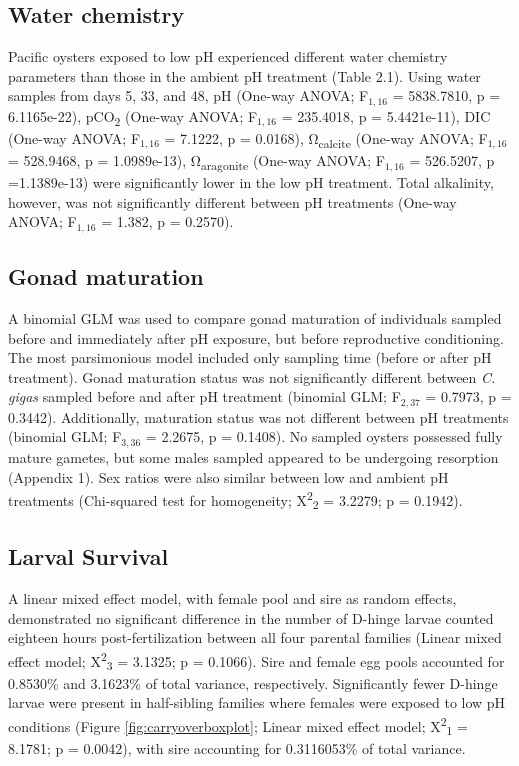 \documentclass [11pt, proquest] {uwthesis}[2015/03/03]
\begin{document}
\hypertarget{water-chemistry}{%
\subsection{Water chemistry}\label{water-chemistry}}

Pacific oysters exposed to low pH experienced different water chemistry parameters than those in the ambient pH treatment (Table 2.1). Using water samples from days 5, 33, and 48, pH (One-way ANOVA; F\(_{1,16}\) = 5838.7810, p = 6.1165e-22), pCO\textsubscript{2} (One-way ANOVA; F\(_{1,16}\) = 235.4018, p = 5.4421e-11), DIC (One-way ANOVA; F\(_{1,16}\) = 7.1222, p = 0.0168), Ω\textsubscript{calcite} (One-way ANOVA; F\(_{1,16}\) = 528.9468, p = 1.0989e-13), Ω\textsubscript{aragonite} (One-way ANOVA; F\(_{1,16}\) = 526.5207, p =1.1389e-13) were significantly lower in the low pH treatment. Total alkalinity, however, was not significantly different between pH treatments (One-way ANOVA; F\(_{1,16}\) = 1.382, p = 0.2570).

\hypertarget{gonad-maturation}{%
\subsection{Gonad maturation}\label{gonad-maturation}}

A binomial GLM was used to compare gonad maturation of individuals sampled before and immediately after pH exposure, but before reproductive conditioning. The most parsimonious model included only sampling time (before or after pH treatment). Gonad maturation status was not significantly different between \emph{C. gigas} sampled before and after pH treatment (binomial GLM; F\(_{2,37}\) = 0.7973, p = 0.3442). Additionally, maturation status was not different between pH treatments (binomial GLM; F\(_{3,36}\) = 2.2675, p = 0.1408). No sampled oysters possessed fully mature gametes, but some males sampled appeared to be undergoing resorption (Appendix 1). Sex ratios were also similar between low and ambient pH treatments (Chi-squared test for homogeneity; X\textsuperscript{2}\textsubscript{2} = 3.2279; p = 0.1942).

\hypertarget{larval-survival}{%
\subsection{Larval Survival}\label{larval-survival}}

A linear mixed effect model, with female pool and sire as random effects, demonstrated no significant difference in the number of D-hinge larvae counted eighteen hours post-fertilization between all four parental families (Linear mixed effect model; X\textsuperscript{2}\textsubscript{3} = 3.1325; p = 0.1066). Sire and female egg pools accounted for 0.8530\% and 3.1623\% of total variance, respectively. Significantly fewer D-hinge larvae were present in half-sibling families where females were exposed to low pH conditions (Figure \ref{fig:carryoverboxplot}; Linear mixed effect model; X\textsuperscript{2}\textsubscript{1} = 8.1781; p = 0.0042), with sire accounting for 0.3116053\% of total variance.
\end{document}
